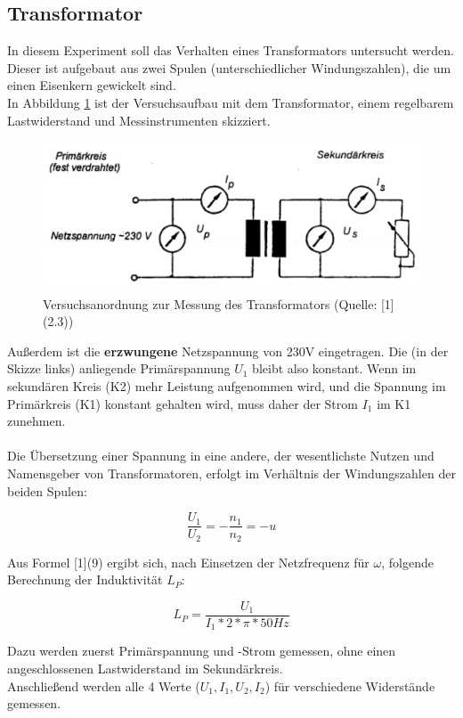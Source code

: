 \documentclass[12pt,a4paper]{article}
\begin{document}
\begin{multicols}{2}
\section{Transformator}
In diesem Experiment soll das Verhalten eines Transformators untersucht werden. Dieser ist aufgebaut aus zwei Spulen (unterschiedlicher Windungszahlen), die um einen Eisenkern gewickelt sind. \\
In Abbildung \ref{fig:schaltung_trafo} ist der Versuchsaufbau mit dem Transformator, einem regelbarem Lastwiderstand und Messinstrumenten skizziert.



\begin{figure}[H]
	\centering
	\includegraphics[scale=0.40]{./figure/schaltskizze_trafo.png}
	\caption{Versuchsanordnung zur Messung des Transformators (Quelle: [1](2.3))}
	\label{fig:schaltung_trafo}
\end{figure}


\noindent
Außerdem ist die \textbf{erzwungene} Netzspannung von 230V eingetragen. Die (in der Skizze links) anliegende Primärspannung $U_1$ bleibt also konstant. Wenn im sekundären Kreis (K2) mehr Leistung aufgenommen wird, und die Spannung im Primärkreis (K1) konstant gehalten wird, muss daher der Strom $I_1$ im K1 zunehmen.\\
\\
Die Übersetzung einer Spannung in eine andere, der wesentlichste Nutzen und Namensgeber von Transformatoren, erfolgt im Verhältnis der Windungszahlen der beiden Spulen:


$$\frac{U_1}{U_2} = -\frac{n_1}{n_2} = -u$$

\noindent
Aus Formel [1](9) ergibt sich, nach Einsetzen der Netzfrequenz für  $\omega$, folgende Berechnung der Induktivität $L_P$:

$$L_P = \frac{U_1}{I_1 * 2*\pi * 50Hz}$$

Dazu werden zuerst Primärspannung und -Strom gemessen, ohne einen angeschlossenen Lastwiderstand im Sekundärkreis.\\
Anschließend werden alle 4 Werte ($U_1, I_1, U_2, I_2$) für verschiedene Widerstände gemessen.






\end{multicols}
\end{document}
